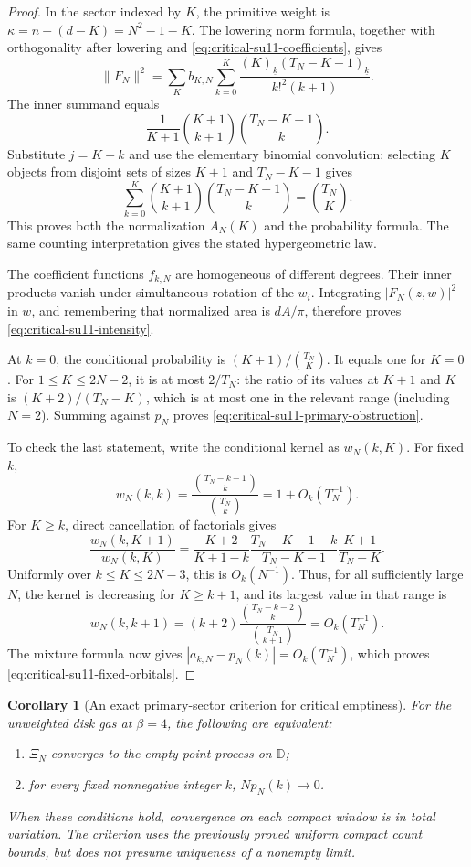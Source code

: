 \documentclass[11pt,a4paper]{article}
\numberwithin{equation}{section}
\newtheorem{corollary}[theorem]{Corollary}
\theoremstyle{definition}
\theoremstyle{remark}
\begin{document}
\begin{proof}
In the sector indexed by $K$, the primitive weight is
$\kappa=n+(d-K)=N^2-1-K$. The lowering norm formula, together with
orthogonality after lowering and \eqref{eq:critical-su11-coefficients},
gives
\[
 \|F_N\|^2
 =\sum_Kb_{K,N}\sum_{k=0}^K
 \frac{(K)_{\underline k}(T_N-K-1)_{\underline k}}
      {k!^2(k+1)}.
\]
The inner summand equals
\[
 \frac1{K+1}\binom{K+1}{k+1}\binom{T_N-K-1}{k}.
\]
Substitute $j=K-k$ and use the elementary binomial convolution: selecting
$K$ objects from disjoint sets of sizes $K+1$ and $T_N-K-1$ gives
\[
 \sum_{k=0}^K\binom{K+1}{k+1}\binom{T_N-K-1}{k}
 =\binom{T_N}{K}.
\]
This proves both the normalization $A_N(K)$ and the probability formula.
The same counting interpretation gives the stated hypergeometric law.

The coefficient functions $f_{k,N}$ are homogeneous of different degrees.
Their inner products vanish under simultaneous rotation of the $w_i$.
Integrating $|F_N(z,w)|^2$ in $w$, and remembering that normalized area
is $dA/\pi$, therefore proves \eqref{eq:critical-su11-intensity}.

At $k=0$, the conditional probability is
$(K+1)/\binom{T_N}{K}$. It equals one for $K=0$. For
$1\leq K\leq2N-2$, it is at most $2/T_N$: the ratio of its values at
$K+1$ and $K$ is $(K+2)/(T_N-K)$, which is at most one in the relevant
range (including $N=2$). Summing against $p_N$ proves
\eqref{eq:critical-su11-primary-obstruction}.

To check the last statement, write the conditional kernel as $w_N(k,K)$.
For fixed $k$,
\[
 w_N(k,k)=\frac{\binom{T_N-k-1}{k}}{\binom{T_N}{k}}
        =1+O_k(T_N^{-1}).
\]
For $K\geq k$, direct cancellation of factorials gives
\[
 \frac{w_N(k,K+1)}{w_N(k,K)}
 =\frac{K+2}{K+1-k}
   \frac{T_N-K-1-k}{T_N-K-1}
   \frac{K+1}{T_N-K}.
\]
Uniformly over $k\leq K\leq2N-3$, this is $O_k(N^{-1})$.
Thus, for all sufficiently large $N$, the kernel is decreasing for
$K\geq k+1$, and its largest value in that range is
\[
 w_N(k,k+1)
 =(k+2)\frac{\binom{T_N-k-2}{k}}{\binom{T_N}{k+1}}
 =O_k(T_N^{-1}).
\]
The mixture formula now gives
$|a_{k,N}-p_N(k)|=O_k(T_N^{-1})$, which proves
\eqref{eq:critical-su11-fixed-orbitals}.
\end{proof}

\begin{corollary}[An exact primary-sector criterion for critical emptiness]
\label{cor:critical-su11-empty-criterion}
For the unweighted disk gas at $\beta=4$, the following are equivalent:
\begin{enumerate}
 \item $\Xi_N$ converges to the empty point process on $\mathbb D$;
 \item for every fixed nonnegative integer $k$, $Np_N(k)\to0$.
\end{enumerate}
When these conditions hold, convergence on each compact window is in
total variation. The criterion uses the previously proved uniform compact
count bounds, but does not presume uniqueness of a nonempty limit.
\end{corollary}
\end{document}
